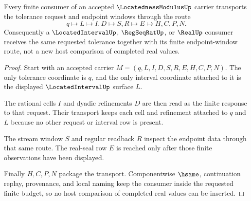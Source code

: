 \begin{theorem}
\label{thm:locatedness-modulus-window-transport}
Every finite consumer of an accepted $\LocatednessModulusUp$ carrier transports the tolerance request and endpoint windows through the route
$$
q \longmapsto L \longmapsto I,D \longmapsto S,R \longmapsto E \longmapsto H,C,P,N .
$$
Consequently a $\LocatedIntervalUp$, $\RegSeqRatUp$, or $\RealUp$ consumer receives the same requested tolerance together with its finite endpoint-window route, not a new host comparison of completed real values.
\end{theorem}
\begin{proof}
Start with an accepted carrier $M=(q,L,I,D,S,R,E,H,C,P,N)$. The only tolerance coordinate is $q$, and the only interval coordinate attached to it is the displayed $\LocatedIntervalUp$ surface $L$.

The rational cells $I$ and dyadic refinements $D$ are then read as the finite response to that request. Their transport keeps each cell and refinement attached to $q$ and $L$ because no other request or interval row is present.

The stream window $S$ and regular readback $R$ inspect the endpoint data through that same route. The real-seal row $E$ is reached only after those finite observations have been displayed.

Finally $H,C,P,N$ package the transport. Componentwise $\hsame$, continuation replay, provenance, and local naming keep the consumer inside the requested finite budget, so no host comparison of completed real values can be inserted.
\end{proof}

